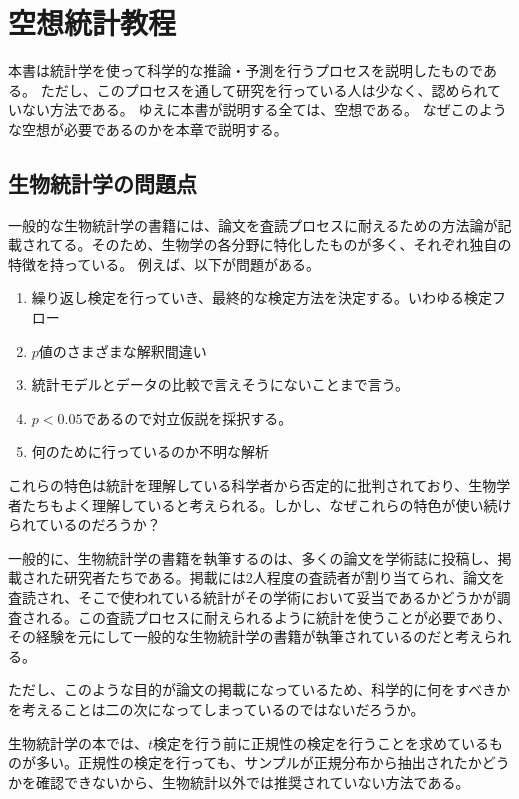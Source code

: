 \chapter{空想統計教程}
本書は統計学を使って科学的な推論・予測を行うプロセスを説明したものである。
ただし、このプロセスを通して研究を行っている人は少なく、認められていない方法である。
ゆえに本書が説明する全ては、空想である。
なぜこのような空想が必要であるのかを本章で説明する。


\section{生物統計学の問題点}
一般的な生物統計学の書籍には、論文を査読プロセスに耐えるための方法論が記載されてる。そのため、生物学の各分野に特化したものが多く、それぞれ独自の特徴を持っている。
例えば、以下が問題がある。

\begin{enumerate}
 \item 繰り返し検定を行っていき、最終的な検定方法を決定する。いわゆる検定フロー
 \item $p$値のさまざまな解釈間違い
 \item 統計モデルとデータの比較で言えそうにないことまで言う。
 \item $p<0.05$であるので対立仮説を採択する。
 \item 何のために行っているのか不明な解析
\end{enumerate}
これらの特色は統計を理解している科学者から否定的に批判されており、生物学者たちもよく理解していると考えられる。しかし、なぜこれらの特色が使い続けられているのだろうか？

一般的に、生物統計学の書籍を執筆するのは、多くの論文を学術誌に投稿し、掲載された研究者たちである。掲載には2人程度の査読者が割り当てられ、論文を査読され、そこで使われている統計がその学術において妥当であるかどうかが調査される。この査読プロセスに耐えられるように統計を使うことが必要であり、その経験を元にして一般的な生物統計学の書籍が執筆されているのだと考えられる。

ただし、このような目的が論文の掲載になっているため、科学的に何をすべきかを考えることは二の次になってしまっているのではないだろうか。


生物統計学の本では、$t$検定を行う前に正規性の検定を行うことを求めているものが多い。正規性の検定を行っても、サンプルが正規分布から抽出されたかどうかを確認できないから、生物統計以外では推奨されていない方法である。

